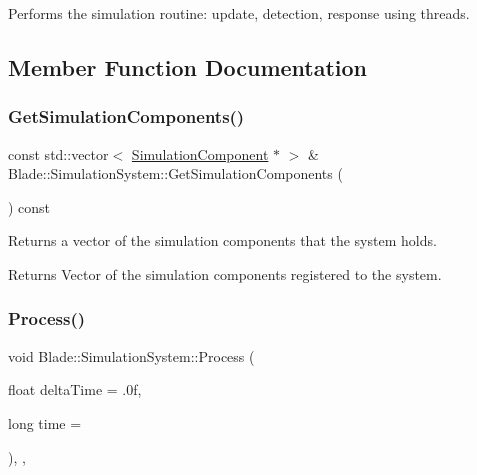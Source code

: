 Performs the simulation routine\+: update, detection, response using threads. 

\subsection{Member Function Documentation}
\mbox{\label{class_blade_1_1_simulation_system_a768e9c35386f9c52e2b06ce381ce7050}} 
\subsubsection{\texorpdfstring{Get\+Simulation\+Components()}{GetSimulationComponents()}}
{\footnotesize\ttfamily const std\+::vector$<$ \hyperlink{class_blade_1_1_simulation_component}{Simulation\+Component} $\ast$ $>$ \& Blade\+::\+Simulation\+System\+::\+Get\+Simulation\+Components (\begin{DoxyParamCaption}{ }\end{DoxyParamCaption}) const\hspace{0.3cm}{\ttfamily [noexcept]}}



Returns a vector of the simulation components that the system holds. 

\begin{DoxyReturn}{Returns}
Vector of the simulation components registered to the system. 
\end{DoxyReturn}
\mbox{\label{class_blade_1_1_simulation_system_ade81487a31325272e8489c772530ccf5}} 
\subsubsection{\texorpdfstring{Process()}{Process()}}
{\footnotesize\ttfamily void Blade\+::\+Simulation\+System\+::\+Process (\begin{DoxyParamCaption}\item[{float}]{delta\+Time = {\ttfamily .0f},  }\item[{long}]{time = {} }\end{DoxyParamCaption})\hspace{0.3cm}{\ttfamily [override]}, {\ttfamily [virtual]}, {\ttfamily [noexcept]}}



